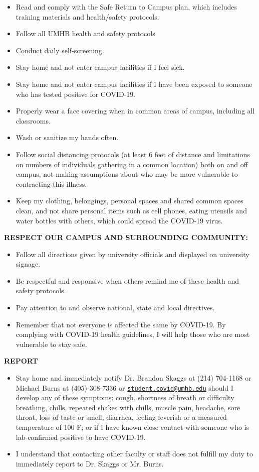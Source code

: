\documentclass[
]{article}
\begin{document}
\begin{itemize}
\item Read and comply with the Safe Return to Campus plan, which includes training materials and health/safety protocols. 
\item Follow all UMHB health and safety protocols 
\item Conduct daily self-screening. 
\item Stay home and not enter campus facilities if I feel sick. 
\item Stay home and not enter campus facilities if I have been exposed to someone who has tested positive for COVID-19. 
\item Properly wear a face covering when in common areas of campus, including all classrooms. 
\item Wash or sanitize my hands often. 
\item Follow social distancing protocols (at least 6 feet of distance and limitations on numbers of individuals gathering in a common location) both on and off campus, not making assumptions about who may be more vulnerable to contracting this illness. 
\item Keep my clothing, belongings, personal spaces and shared common spaces clean, and not share personal items such as cell phones, eating utensils and water bottles with others, which could spread the COVID-19 virus.
\end{itemize}

\textbf{RESPECT OUR CAMPUS AND SURROUNDING COMMUNITY:}

\begin{itemize}
\item Follow all directions given by university officials and displayed on university signage. 
\item Be respectful and responsive when others remind me of these health and safety protocols. 
\item Pay attention to and observe national, state and local directives. 
\item Remember that not everyone is affected the same by COVID-19. By complying with COVID-19 health guidelines, I will help those who are most vulnerable to stay safe. 
\end{itemize}

\textbf{REPORT}

\begin{itemize}
\item Stay home and immediately notify Dr. Brandon Skaggs at (214) 704-1168 or Michael Burns at (405) 308-7336 or \texttt{\href{mailto:student.covid@umhb.edu}{student.covid@umhb.edu}} should I develop any of these symptoms: cough, shortness of breath or difficulty breathing, chills, repeated shakes with chills, muscle pain, headache, sore throat, loss of taste or smell, diarrhea, feeling feverish or a measured temperature of 100 F; or if I have known close contact with someone who is lab-confirmed positive to have COVID-19. 
\item I understand that contacting other faculty or staff does not fulfill my duty to immediately report to Dr. Skaggs or Mr. Burns.
\end{itemize}
\end{document}
